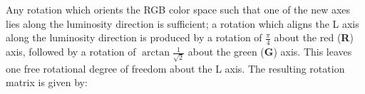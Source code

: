 











%



Any rotation which orients the RGB color space such that one of the new axes lies along the luminosity direction is sufficient; a rotation which aligns the L axis along the luminosity direction is produced by a rotation of $\frac{\pi}4$ about the red (\textbf{R}) axis, followed by a rotation of $\arctan{\frac{1}{\sqrt{2}}}$ about the green (\textbf{G}) axis. This leaves one free rotational degree of freedom about the L axis. The resulting rotation matrix is given by:

%







